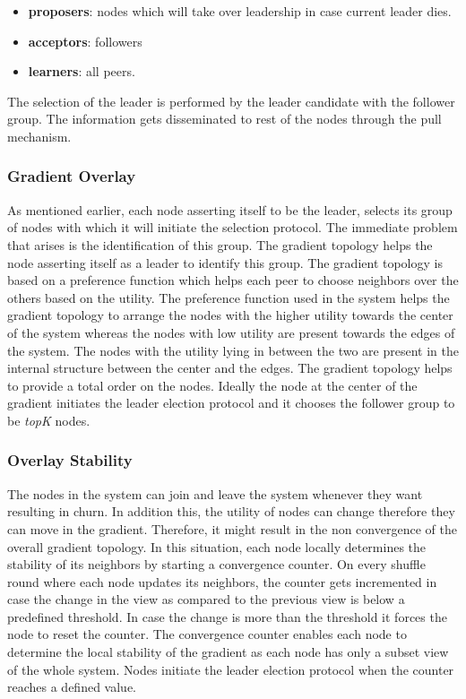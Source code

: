\documentclass[12pt,a4paper,twoside,openright]{book}
\begin{document}
\begin{itemize}

\item \textbf{proposers}: nodes which will take over leadership in case current leader dies.
\item \textbf{acceptors}: followers
\item \textbf{learners}: all peers.

\end{itemize}

The selection of the leader is performed by the leader candidate with the follower group. The information gets disseminated to rest of the nodes through the pull mechanism.

\subsubsection{Gradient Overlay}

As mentioned earlier, each node asserting itself to be the leader, selects its group of nodes with which it will initiate the selection protocol. The immediate problem that arises is the identification of this group. The gradient topology helps the node asserting itself as a leader to identify this group. The gradient topology is based on a preference function which helps each peer to choose neighbors over the others based on the utility. The preference function used in the system helps the gradient topology to arrange the nodes with the higher utility towards the center of the system whereas the nodes with low utility are present towards the edges of the system. The nodes with the utility lying in between the two are present in the internal structure between the center and the edges. The gradient topology helps to provide a total order on the nodes. Ideally the node at the center of the gradient initiates the leader election protocol and it chooses the follower group to be \textit{topK} nodes. 


\subsubsection{Overlay Stability}

The nodes in the system can join and leave the system whenever they want resulting in churn. In addition this, the utility of nodes can change therefore they can move in the gradient. Therefore, it might result in the non convergence of the overall gradient topology. In this situation, each node locally determines the stability of its neighbors by starting a convergence counter. On every shuffle round where each node updates its neighbors, the counter gets incremented in case the change in the view as compared to the previous view is below a predefined threshold. In case the change is more than the threshold it forces the node to reset the counter. The convergence counter enables each node to determine the local stability of the gradient as each node has only a subset view of the whole system. Nodes initiate the leader election protocol when the counter reaches a defined value.
\end{document}
